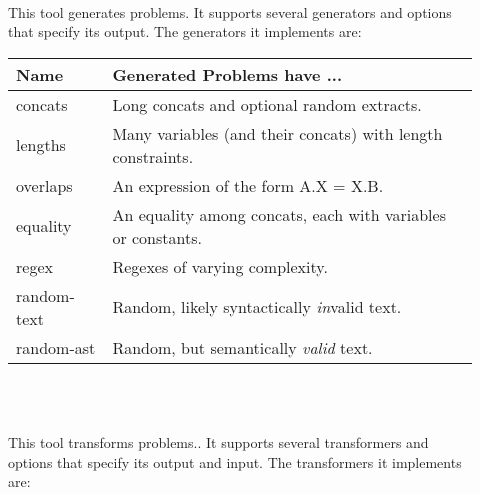    \begin{description}

        \item[\generator{}] \hfill \\
            This tool generates \smt{} problems. It supports several generators and options that specify its output. The generators it implements are: \\

            \begin{tabular}{|l|l|}
                \hline
                \textbf{Name} & \textbf{Generated Problems have ...} \\ \hline
                concats       & Long concats and optional random extracts. \\ \hline
                lengths       & Many variables (and their concats) with length constraints. \\ \hline
                overlaps      & An expression of the form A.X = X.B. \\ \hline
                equality      & An equality among concats, each with variables or constants. \\ \hline
                regex         & Regexes of varying complexity. \\ \hline
                random-text   & Random, likely syntactically \textit{in}valid text. \\ \hline
                random-ast    & Random, but semantically \textit{valid} text. \\ \hline
            \end{tabular}

            \hfill \\

        \item[\transformer{}] \hfill \\

            This tool transforms \smt{} problems.. It supports several transformers and options that specify its output and input. The transformers it implements are: \\



\end{description}

